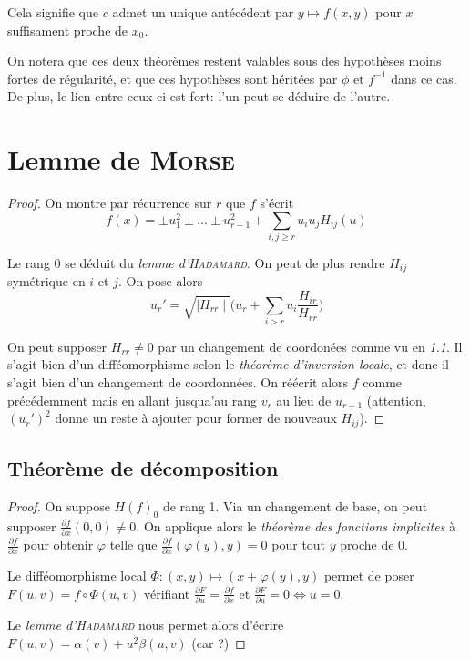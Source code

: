 \documentclass[a4paper]{article}
\begin{document}
Cela signifie que $c$ admet un unique antécédent par $y\mapsto f(x,y)$ pour $x$ suffisament proche de $x_0$.

\bigskip

On notera que ces deux théorèmes restent valables sous des hypothèses moins fortes de régularité, et que ces hypothèses sont héritées par $\phi$ et $f^{-1}$ dans ce cas. De plus, le lien entre ceux-ci est fort: l'un peut se déduire de l'autre.

\section{Lemme de \textsc{Morse}}

\begin{proof}
On montre par récurrence sur $r$ que $f$ s'écrit $$f(x)=\pm u_1^2 \pm...\pm u_{r-1}^2 + \sum_{i,j\geq r} u_iu_jH_{ij}(u)$$

Le rang 0 se déduit du \textit{lemme d'\textsc{Hadamard}}. On peut de plus rendre $H_{ij}$ symétrique en $i$ et $j$. On pose alors $$u_r' =\sqrt{\mid H_{rr}\mid}\big(u_r+\sum_{i>r}u_i\frac{H_{ir}}{H_{rr}}\big)$$

On peut supposer $H_{rr}\neq 0$ par un changement de coordonées comme vu en \textit{1.1}. Il s'agit bien d'un difféomorphisme selon le \textit{théorème d'inversion locale}, et donc il s'agit bien d'un changement de coordonnées. On réécrit alors $f$ comme précédemment mais en allant jusqua'au rang $v_r$ au lieu de $u_{r-1}$ (attention, $(u_r')^2$ donne un reste à ajouter pour former de nouveaux $H_{ij}$).
\end{proof}

\subsection{Théorème de décomposition}
\begin{proof}
On suppose $H(f)_0$ de rang 1. Via un changement de base, on peut supposer $\frac{\partial f}{\partial x}(0,0) \neq 0$. On applique alors le \textit{théorème des fonctions implicites} à $\frac{\partial f}{\partial x}$ pour obtenir $\varphi$ telle que $\frac{\partial f}{\partial x}(\varphi(y), y)=0$ pour tout $y$ proche de 0.

Le difféomorphisme local $\Phi: (x,y) \mapsto (x+\varphi(y), y)$ permet de poser $F(u,v) = f\circ\Phi(u,v)$ vérifiant $\frac{\partial F}{\partial u}=\frac{\partial f}{\partial x}$ et $\frac{\partial F}{\partial u}=0 \iff u=0$.

Le \textit{lemme d'\textsc{Hadamard}} nous permet alors d'écrire $F(u,v)=\alpha(v)+u^2\beta(u, v)$ (car ?)
\end{proof}
\end{document}
